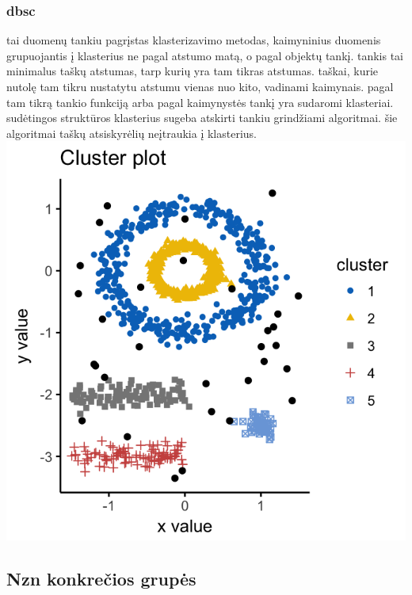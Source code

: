 \documentclass{VUMIFInfKursinis}
\begin{document}
		\subsubsection{dbsc}
			 tai duomenų tankiu pagrįstas klasterizavimo metodas, kaimyninius duomenis grupuojantis į klasterius ne pagal atstumo matą, o pagal objektų tankį. tankis tai minimalus taškų atstumas, tarp kurių yra tam tikras atstumas. taškai, kurie nutolę tam tikru nustatytu atstumu vienas nuo kito, vadinami kaimynais. pagal tam tikrą tankio funkciją arba pagal kaimynystės tankį yra sudaromi klasteriai. sudėtingos struktūros klasterius sugeba atskirti tankiu grindžiami algoritmai. šie algoritmai taškų atsiskyrėlių neįtraukia į klasterius.
			\includegraphics{DBSCAN}

	\subsection{Nzn konkrečios grupės}	
\end{document}

